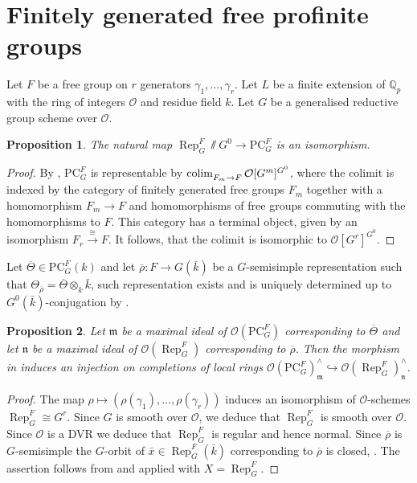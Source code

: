 \documentclass{amsart}
\newtheorem{prop}{Proposition}[section]
\theoremstyle{definition}
\theoremstyle{remark}
\DeclareMathOperator{\Rep}{Rep}
\newcommand{\Qp}{\mathbb {Q}_p}
\newcommand{\mm}{\mathfrak m}
\newcommand{\OO}{\mathcal O}
\newcommand{\nn}{\mathfrak n}
\newcommand{\rhobar}{\overline{\rho}}
\newcommand{\xbar}{\bar{x}}
\newcommand{\kbar}{\bar{k}}
\newcommand{\PC}{\mathrm{PC}}
\renewcommand{\xbar}{\bar{x}}
\newcommand{\Thetabar}{\overline{\Theta}}
\newcommand{\colim}{\mathop{\mathstrut\rm colim}\limits}
\newcommand{\eqto}{\xrightarrow{\cong}}
\begin{document}
\section{Finitely generated free profinite groups}\label{sec_free}
Let $F$ be a free group on $r$ generators
$\gamma_1, \ldots, \gamma_r$. 
Let $L$ be a finite extension
of $\Qp$ with the ring of integers $\OO$ and residue field $k$. Let $G$ be 
a generalised reductive group scheme over $\OO$.



\begin{prop}\label{finite_inv}The natural map $\Rep^F_G\sslash G^0 \rightarrow \PC^F_G$ is an isomorphism. 
\end{prop}

\begin{proof}
    By \cite[Theorem 3.20]{quast}, $\PC^F_G$ is representable by $\colim\nolimits_{F_m \to F} \OO[G^m]^{G^0}$, where the colimit is indexed by the category of finitely generated free groups $F_m$ together with a homomorphism $F_m \to F$ and homomorphisms of free groups commuting with the homomorphisms to $F$. This category has a terminal object, given by an isomorphism $F_r \eqto F$. It follows, that the colimit is isomorphic to $\OO[G^r]^{G^0}$.
\end{proof}

Let $\Thetabar\in \PC^{F}_{G}(k)$ and
let $\rhobar: F\rightarrow G(\kbar)$ be a $G$-semisimple representation such that $\Theta_{\rhobar}=\Thetabar\otimes_k \kbar$, such 
representation exists and is uniquely determined up to $G^0(\kbar)$-conjugation by \cite[Theorem 3.7]{quast}.
\begin{prop}\label{inj_prop} Let $\mm$ be a maximal ideal of $\OO(\PC^F_G)$
corresponding to $\Thetabar$ and let $\nn$ be a maximal ideal
of $\OO(\Rep^F_G)$ corresponding to $\rhobar$. Then the
morphism in  induces an injection on completions of local rings
$\OO(\PC^F_G)_{\mm}^{\wedge} \hookrightarrow \OO(\Rep^F_G)^{\wedge}_{\nn}$.
\end{prop} 
\begin{proof} The map 
$\rho\mapsto (\rho(\gamma_1), \ldots, \rho(\gamma_r))$ induces an isomorphism of $\OO$-schemes $\Rep^{F}_G \cong G^r$. Since $G$ is smooth over $\OO$, we deduce that 
$\Rep^F_G$ is smooth over $\OO$. Since $\OO$ is a DVR we deduce that $\Rep^F_G$ is regular and hence normal. Since $\rhobar$ is $G$-semisimple the $G$-orbit of $\xbar\in \Rep^F_G(\kbar)$ corresponding to $\rhobar$ is closed, \cite[Proposition 6.7]{defG}. The assertion follows from  and 
 applied with $X=\Rep^{F}_{G}$. 
\end{proof}
\end{document}
